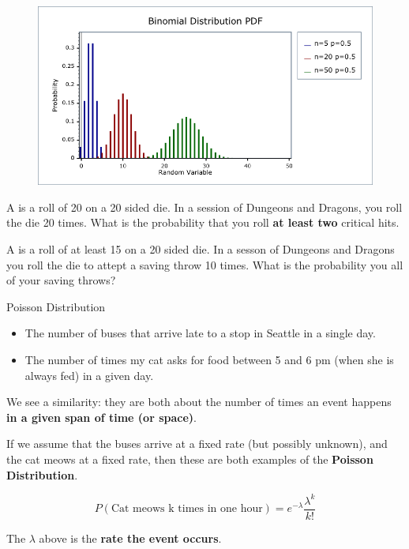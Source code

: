 %
\begin{frame}

  \begin{figure}
    \includegraphics[scale=0.5]{binomial-pdf-changing-n}
  \end{figure}

\end{frame}
%

%
\begin{frame}

A  is a roll of 20 on a 20 sided die.  In a session of
Dungeons and Dragons, you roll the die 20 times.  What is the probability that
you roll \textbf{at least two} critical hits.

\hfill

A  is a roll of at least 15 on a 20 sided die.  In a sesson
of Dungeons and Dragons you roll the die to attept a saving throw 10 times.
What is the probability you  all of your saving throws?

\end{frame}
%

%
\begin{frame}{Poisson Distribution}

\begin{itemize}
\item The number of buses that arrive late to a stop in Seattle in a single
day.
\item The number of times my cat asks for food between 5 and 6 pm (when she is
always fed) in a given day.
\end{itemize}

We see a similarity: they are both about the number of times an event happens
\textbf{in a given span of time (or space)}.
\end{frame}
%

%
\begin{frame}
If we assume that the buses arrive at a fixed rate (but possibly unknown), and
the cat meows at a fixed rate, then these are both examples of the
\textbf{Poisson Distribution}.

$$ P(\text{Cat meows k times in one hour}) = e^{-\lambda} \frac{\lambda^k}{k!}
$$

The $\lambda$ above is the \textbf{rate the event occurs}.
\end{frame}
%

